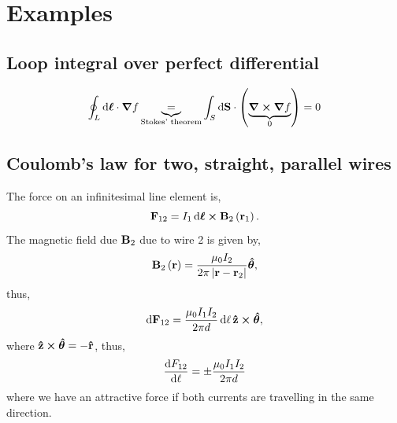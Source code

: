 \documentclass{book}
\begin{document}
\chapter{Examples}
\section{Loop integral over perfect differential}
	\begin{equation}
		\oint_L \dd{\vb*{\ell}} \cdot \grad f \underbrace{=}_{\text{Stokes' theorem}} \int_S \dd{\vb{S}} \cdot\left(\underbrace{\curl{\grad f}}_0\right) = 0
	\end{equation}
\section{Coulomb's law for two, straight, parallel wires}
The force on an infinitesimal line element is,
\begin{equation}
	\vb{F}_{12} = I_1\dd{\vb*{\ell}}\cross\vb{B}_2\left(\vb{r}_1\right).
\end{equation}
The magnetic field due $\vb{B}_2$ due to wire 2 is given by,
\begin{equation}
	\vb{B}_2\left(\vb{r}\right) = \frac{\mu_0 I_2}{2\pi\left|\vb{r} - \vb{r}_2\right|}\vu*{\theta},
\end{equation}
thus,
\begin{equation}
	\dd{\vb{F}_{12}} = \frac{\mu_0 I_1I_2}{2\pi d}\dd{\ell}\vu{z}\cross\vu*{\theta},
\end{equation}
where $\vu{z}\cross\vu*{\theta} = - \vu{r}$, thus,
\begin{equation}
	\dv{F_{12}}{\ell} = \pm \frac{\mu_0 I_1I_2}{2\pi d}
\end{equation}
where we have an attractive force if both currents are travelling in the same direction.
\end{document}
